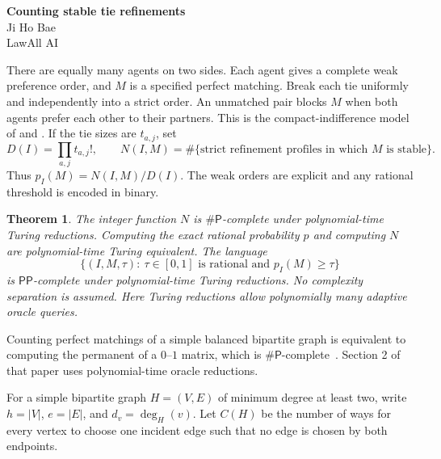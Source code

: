\documentclass[11pt]{article}
\newtheorem{theorem}{Theorem}
\newcommand{\PP}{\mathsf{PP}}
\newcommand{\sharpP}{\mathsf{\#P}}
\begin{document}
\begin{center}
{\Large\bfseries Counting stable tie refinements}\\[5pt]
{\small Ji Ho Bae}\\
{\small LawAll AI}
\end{center}

There are equally many agents on two sides. Each agent gives a complete
weak preference order, and $M$ is a specified perfect matching.
Break each tie uniformly and independently into a strict order.
An unmatched pair blocks $M$ when both agents prefer each other to their
partners.
This is the compact-indifference model of
\cite[Section 3.1.2, Table 1]{survey} and
\cite[Sections 2 and 5, Table 3]{uncertain}.
If the tie sizes are $t_{a,j}$, set
\[
 D(I)=\prod_{a,j}t_{a,j}!,\qquad
 N(I,M)=\#\{\text{strict refinement profiles in which }M\text{ is stable}\}.
\]
Thus $p_I(M)=N(I,M)/D(I)$. The weak orders are explicit and any rational
threshold is encoded in binary.

\begin{theorem}\label{thm:classification}
The integer function $N$ is $\sharpP$-complete under polynomial-time
Turing reductions. Computing the exact rational probability $p$ and
computing $N$ are polynomial-time Turing equivalent.
The language
\[
 \{(I,M,\tau):\ \tau\in[0,1]\text{ is rational and }p_I(M)\geq\tau\}
\]
is $\PP$-complete under polynomial-time Turing reductions.
No complexity separation is assumed. Here Turing reductions allow
polynomially many adaptive oracle queries.
\end{theorem}

Counting perfect matchings of a simple balanced bipartite graph is equivalent
to computing the permanent of a $0$--$1$ matrix, which is
$\sharpP$-complete~\cite[Theorem 1]{valiant}. Section 2 of that paper
uses polynomial-time oracle reductions.

For a simple bipartite graph $H=(V,E)$ of minimum degree at least two,
write $h=|V|$, $e=|E|$, and $d_v=\deg_H(v)$.
Let $C(H)$ be the number of ways for every vertex to choose one incident
edge such that no edge is chosen by both endpoints.
\end{document}
